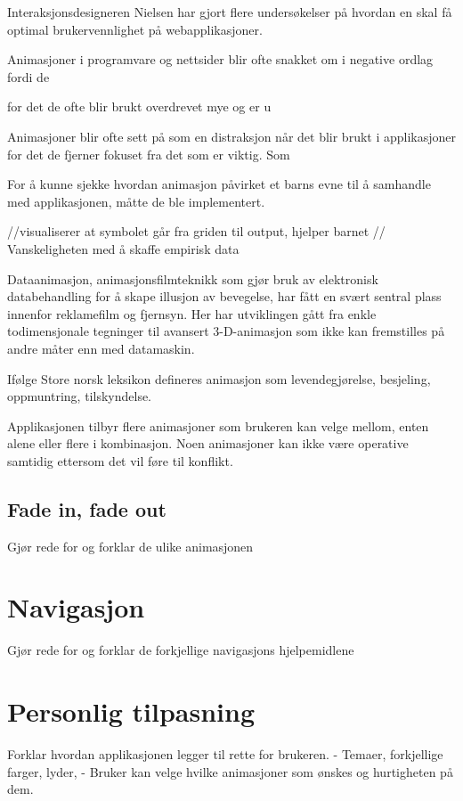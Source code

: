 \documentclass[phd,tocprelim]{cornell}
\begin{document}
Interaksjonsdesigneren Nielsen har gjort flere undersøkelser på hvordan en skal få optimal brukervennlighet på webapplikasjoner. 

Animasjoner i programvare og nettsider blir ofte snakket om i negative ordlag fordi de

for det de ofte blir brukt overdrevet mye og er u

Animasjoner blir ofte sett på som en distraksjon når det blir brukt i applikasjoner for det de fjerner fokuset fra det som er viktig. Som 


For å kunne sjekke hvordan animasjon påvirket et barns evne til å samhandle med applikasjonen, måtte de ble implementert.  

//visualiserer at symbolet går fra griden til output, hjelper barnet
// Vanskeligheten med å skaffe empirisk data


Dataanimasjon, animasjonsfilmteknikk som gjør bruk av elektronisk databehandling for å skape illusjon av bevegelse, har fått en svært sentral plass innenfor reklamefilm og fjernsyn. Her har utviklingen gått fra enkle todimensjonale tegninger til avansert 3-D-animasjon som ikke kan fremstilles på andre måter enn med datamaskin.

Ifølge Store norsk leksikon defineres animasjon som levendegjørelse, besjeling, oppmuntring, tilskyndelse. 


Applikasjonen tilbyr flere animasjoner som brukeren kan velge mellom, enten alene eller flere i kombinasjon. Noen animasjoner kan ikke være operative samtidig ettersom det vil føre til konflikt. 

\subsection{Fade in, fade out}

Gjør rede for og forklar de ulike animasjonen

\section{Navigasjon}
Gjør rede for og forklar de forkjellige navigasjons hjelpemidlene

\section{Personlig tilpasning}
Forklar hvordan applikasjonen legger til rette for brukeren.
    - Temaer, forkjellige farger, lyder, 
    - Bruker kan velge hvilke animasjoner som ønskes og hurtigheten på dem.
    
\end{document}

